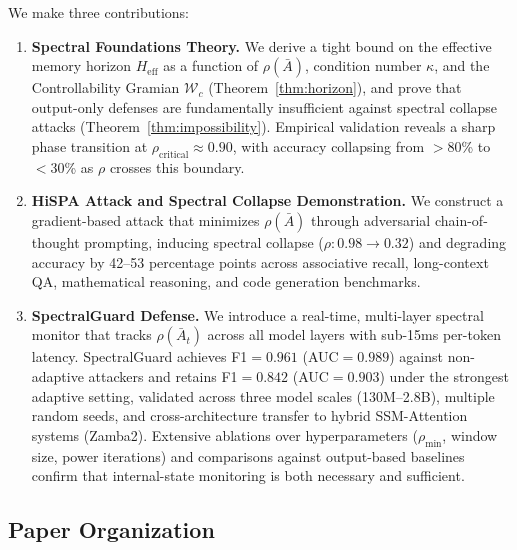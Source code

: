 \documentclass[10pt,twocolumn]{article}
\begin{document}
We make three contributions:

\begin{enumerate}[label=\textbf{(\arabic*)}]
\item \textbf{Spectral Foundations Theory.} We derive a tight bound on the effective memory horizon $H_{\text{eff}}$ as a function of $\rho(\bar{A})$, condition number $\kappa$, and the Controllability Gramian $\mathcal{W}_c$ (Theorem~\ref{thm:horizon}), and prove that output-only defenses are fundamentally insufficient against spectral collapse attacks (Theorem~\ref{thm:impossibility}). Empirical validation reveals a sharp phase transition at $\rho_{\text{critical}} \approx 0.90$, with accuracy collapsing from $>$80\% to $<$30\% as $\rho$ crosses this boundary.

\item \textbf{HiSPA Attack and Spectral Collapse Demonstration.} We construct a gradient-based attack that minimizes $\rho(\bar{A})$ through adversarial chain-of-thought prompting, inducing spectral collapse ($\rho: 0.98 \to 0.32$) and degrading accuracy by 42--53 percentage points across associative recall, long-context QA, mathematical reasoning, and code generation benchmarks.

\item \textbf{SpectralGuard Defense.} We introduce a real-time, multi-layer spectral monitor that tracks $\rho(\bar{A}_t)$ across all model layers with sub-15ms per-token latency. SpectralGuard achieves F1$=0.961$ (AUC$=0.989$) against non-adaptive attackers and retains F1$=0.842$ (AUC$=0.903$) under the strongest adaptive setting, validated across three model scales (130M--2.8B), multiple random seeds, and cross-architecture transfer to hybrid SSM-Attention systems (Zamba2). Extensive ablations over hyperparameters ($\rho_{\min}$, window size, power iterations) and comparisons against output-based baselines confirm that internal-state monitoring is both necessary and sufficient.
\end{enumerate}

\subsection{Paper Organization}
\end{document}

